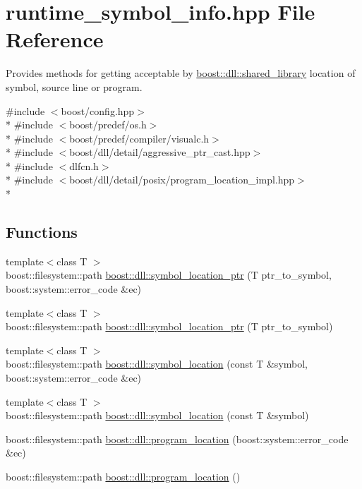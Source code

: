 \hypertarget{a00705}{}\section{runtime\+\_\+symbol\+\_\+info.\+hpp File Reference}
\label{a00705}


Provides methods for getting acceptable by \hyperlink{a00271}{boost\+::dll\+::shared\+\_\+library} location of symbol, source line or program.  


{\ttfamily \#include $<$boost/config.\+hpp$>$}\\*
{\ttfamily \#include $<$boost/predef/os.\+h$>$}\\*
{\ttfamily \#include $<$boost/predef/compiler/visualc.\+h$>$}\\*
{\ttfamily \#include $<$boost/dll/detail/aggressive\+\_\+ptr\+\_\+cast.\+hpp$>$}\\*
{\ttfamily \#include $<$dlfcn.\+h$>$}\\*
{\ttfamily \#include $<$boost/dll/detail/posix/program\+\_\+location\+\_\+impl.\+hpp$>$}\\*
\subsection*{Functions}
\begin{DoxyCompactItemize}
\item 
{\footnotesize template$<$class T $>$ }\\boost\+::filesystem\+::path \hyperlink{a00705_a1a70f04489d9c27a7c12a663681a2557}{boost\+::dll\+::symbol\+\_\+location\+\_\+ptr} (T ptr\+\_\+to\+\_\+symbol, boost\+::system\+::error\+\_\+code \&ec)
\item 
{\footnotesize template$<$class T $>$ }\\boost\+::filesystem\+::path \hyperlink{a00705_ae6aac347e0e9cbae31c26f52ebb0ce85}{boost\+::dll\+::symbol\+\_\+location\+\_\+ptr} (T ptr\+\_\+to\+\_\+symbol)
\item 
{\footnotesize template$<$class T $>$ }\\boost\+::filesystem\+::path \hyperlink{a00705_a91b824b8cdf4e600546d636fd09672f9}{boost\+::dll\+::symbol\+\_\+location} (const T \&symbol, boost\+::system\+::error\+\_\+code \&ec)
\item 
{\footnotesize template$<$class T $>$ }\\boost\+::filesystem\+::path \hyperlink{a00705_ada9f78ac87565980f6c639f3b2e30892}{boost\+::dll\+::symbol\+\_\+location} (const T \&symbol)
\item 
boost\+::filesystem\+::path \hyperlink{a00705_a2e682f5c6e64ed097bf29e4490334ddf}{boost\+::dll\+::program\+\_\+location} (boost\+::system\+::error\+\_\+code \&ec)
\item 
boost\+::filesystem\+::path \hyperlink{a00705_af400fcad737237876fc4a30969936063}{boost\+::dll\+::program\+\_\+location} ()
\end{DoxyCompactItemize}


